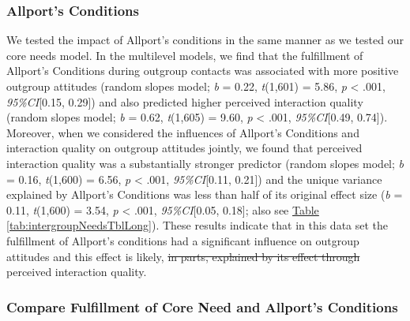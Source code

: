 \documentclass[man, 12pt, a4paper, mask]{apa7}
\theoremstyle{break}
\theoremstyle{plain}
\newcommand{\tblref}[2][]{\hyperref[#2]{Table \ref*{#2}#1}}
\providecommand{\DIFaddtex}[1]{{\protect\color{blue}\uwave{#1}}} %
\providecommand{\DIFdeltex}[1]{{\protect\color{red}\sout{#1}}}                      %
\providecommand{\DIFaddbegin}{} %
\providecommand{\DIFaddend}{} %
\providecommand{\DIFdelbegin}{} %
\providecommand{\DIFdelend}{} %
\providecommand{\DIFadd}[1]{\texorpdfstring{\DIFaddtex{#1}}{#1}} %
\providecommand{\DIFdel}[1]{\texorpdfstring{\DIFdeltex{#1}}{}} %
\newcommand{\DIFscaledelfig}{0.5}
\newlength{\DIFdelgraphicswidth} %
\newlength{\DIFdelgraphicsheight} %
\newcommand{\DIFaddincludegraphics}[2][]{{\color{blue}\fbox{\DIFOincludegraphics[#1]{#2}}}} %
\newcommand{\DIFdelincludegraphics}[2][]{%
\sbox{\DIFdelgraphicsbox}{\DIFOincludegraphics[#1]{#2}}%
\settoboxwidth{\DIFdelgraphicswidth}{\DIFdelgraphicsbox} %
\settoboxtotalheight{\DIFdelgraphicsheight}{\DIFdelgraphicsbox} %
\scalebox{\DIFscaledelfig}{%
\parbox[b]{\DIFdelgraphicswidth}{\usebox{\DIFdelgraphicsbox}\\[-\baselineskip] \rule{\DIFdelgraphicswidth}{0em}}\llap{\resizebox{\DIFdelgraphicswidth}{\DIFdelgraphicsheight}{%
\setlength{\unitlength}{\DIFdelgraphicswidth}%
\begin{picture}(1,1)%
\thicklines\linethickness{2pt} %
{\color[rgb]{1,0,0}\put(0,0){\framebox(1,1){}}}%
{\color[rgb]{1,0,0}\put(0,0){\line( 1,1){1}}}%
{\color[rgb]{1,0,0}\put(0,1){\line(1,-1){1}}}%
\end{picture}%
}\hspace*{3pt}}} %
} %
\DeclareRobustCommand{\DIFaddbegin}{\DIFOaddbegin \let\includegraphics\DIFaddincludegraphics} %
\DeclareRobustCommand{\DIFaddend}{\DIFOaddend \let\includegraphics\DIFOincludegraphics} %
\DeclareRobustCommand{\DIFdelbegin}{\DIFOdelbegin \let\includegraphics\DIFdelincludegraphics} %
\DeclareRobustCommand{\DIFdelend}{\DIFOaddend \let\includegraphics\DIFOincludegraphics} %
\begin{document}
\subsubsection{Allport's Conditions}

We tested the impact of Allport's conditions in the same manner as we
tested our core needs model. In the multilevel models, we find that the
fulfillment of Allport's Conditions during outgroup contacts was
associated with more positive outgroup attitudes (random slopes model;
\textit{b} = 0.22, \textit{t}(1,601) = 5.86, \textit{p} \textless{}
.001, \textit{95\%CI}{[}0.15, 0.29{]}) and also predicted higher
perceived interaction quality (random slopes model; \textit{b} = 0.62,
\textit{t}(1,605) = 9.60, \textit{p} \textless{} .001,
\textit{95\%CI}{[}0.49, 0.74{]}). Moreover, when we considered the
influences of Allport's Conditions and interaction quality on outgroup
attitudes jointly, we found that perceived interaction quality was a
substantially stronger predictor (random slopes model; \textit{b} =
0.16, \textit{t}(1,600) = 6.56, \textit{p} \textless{} .001,
\textit{95\%CI}{[}0.11, 0.21{]}) and the unique variance explained by
Allport's Conditions was less than half of its original effect size
(\textit{b} = 0.11, \textit{t}(1,600) = 3.54, \textit{p} \textless{}
.001, \textit{95\%CI}{[}0.05, 0.18{]}; also see
\tblref{tab:intergroupNeedsTblLong}). These results indicate that in
this data set the fulfillment of Allport's conditions had a significant
influence on outgroup attitudes and this effect is likely, \DIFdelbegin \DIFdel{in parts,
explained by its effect through }\DIFdelend \DIFaddbegin \DIFadd{related to
the effect of }\DIFaddend perceived interaction quality.

\subsubsection{Compare Fulfillment of Core Need and Allport's Conditions}
\end{document}
